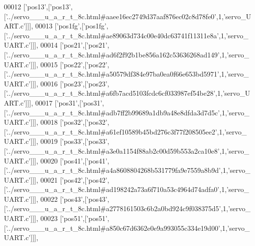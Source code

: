 \begin{DoxyCode}
00012   [\textcolor{stringliteral}{'pos13'},[\textcolor{stringliteral}{'pos13'},[\textcolor{stringliteral}{'../servo\_\_\_u\_a\_r\_t\_8c.html#aaee16ec2749d37aaf876ec02c8d78fe0'},1,\textcolor{stringliteral}{'servo\_UART.c'}]]],
00013   [\textcolor{stringliteral}{'pos1fg'},[\textcolor{stringliteral}{'pos1fg'},[\textcolor{stringliteral}{'../servo\_\_\_u\_a\_r\_t\_8c.html#ae89063d734c00e40dc63741f11311e8a'},1,\textcolor{stringliteral}{'servo\_UART.c'}]]],
00014   [\textcolor{stringliteral}{'pos21'},[\textcolor{stringliteral}{'pos21'},[\textcolor{stringliteral}{'../servo\_\_\_u\_a\_r\_t\_8c.html#ad6f2f92b1be856a162c53636268ad149'},1,\textcolor{stringliteral}{'servo\_UART.c'}]]],
00015   [\textcolor{stringliteral}{'pos22'},[\textcolor{stringliteral}{'pos22'},[\textcolor{stringliteral}{'../servo\_\_\_u\_a\_r\_t\_8c.html#a50579df384e97ba0ea0f66e653bd5971'},1,\textcolor{stringliteral}{'servo\_UART.c'}]]],
00016   [\textcolor{stringliteral}{'pos23'},[\textcolor{stringliteral}{'pos23'},[\textcolor{stringliteral}{'../servo\_\_\_u\_a\_r\_t\_8c.html#a6fb7acd5103fcdc6cf033987ef54be28'},1,\textcolor{stringliteral}{'servo\_UART.c'}]]],
00017   [\textcolor{stringliteral}{'pos31'},[\textcolor{stringliteral}{'pos31'},[\textcolor{stringliteral}{'../servo\_\_\_u\_a\_r\_t\_8c.html#adb7ff2b99689a1db9a48e8dfda3d7d5c'},1,\textcolor{stringliteral}{'servo\_UART.c'}]]],
00018   [\textcolor{stringliteral}{'pos32'},[\textcolor{stringliteral}{'pos32'},[\textcolor{stringliteral}{'../servo\_\_\_u\_a\_r\_t\_8c.html#a61ef10589b45bd276c3f77f208505ee2'},1,\textcolor{stringliteral}{'servo\_UART.c'}]]],
00019   [\textcolor{stringliteral}{'pos33'},[\textcolor{stringliteral}{'pos33'},[\textcolor{stringliteral}{'../servo\_\_\_u\_a\_r\_t\_8c.html#a3e0a1154f88ab2c00d59b553a2ca10e8'},1,\textcolor{stringliteral}{'servo\_UART.c'}]]],
00020   [\textcolor{stringliteral}{'pos41'},[\textcolor{stringliteral}{'pos41'},[\textcolor{stringliteral}{'../servo\_\_\_u\_a\_r\_t\_8c.html#a4a8608804268b531779fa9e7559a8b9d'},1,\textcolor{stringliteral}{'servo\_UART.c'}]]],
00021   [\textcolor{stringliteral}{'pos42'},[\textcolor{stringliteral}{'pos42'},[\textcolor{stringliteral}{'../servo\_\_\_u\_a\_r\_t\_8c.html#ad198242a73a6f710a53c4964d74adfa0'},1,\textcolor{stringliteral}{'servo\_UART.c'}]]],
00022   [\textcolor{stringliteral}{'pos43'},[\textcolor{stringliteral}{'pos43'},[\textcolor{stringliteral}{'../servo\_\_\_u\_a\_r\_t\_8c.html#a2778161503c6b2a0bd924c9f038375d5'},1,\textcolor{stringliteral}{'servo\_UART.c'}]]],
00023   [\textcolor{stringliteral}{'pos51'},[\textcolor{stringliteral}{'pos51'},[\textcolor{stringliteral}{'../servo\_\_\_u\_a\_r\_t\_8c.html#a850c67d6362e0e9a993055c334e19d00'},1,\textcolor{stringliteral}{'servo\_UART.c'}]]],

\end{DoxyCode}
